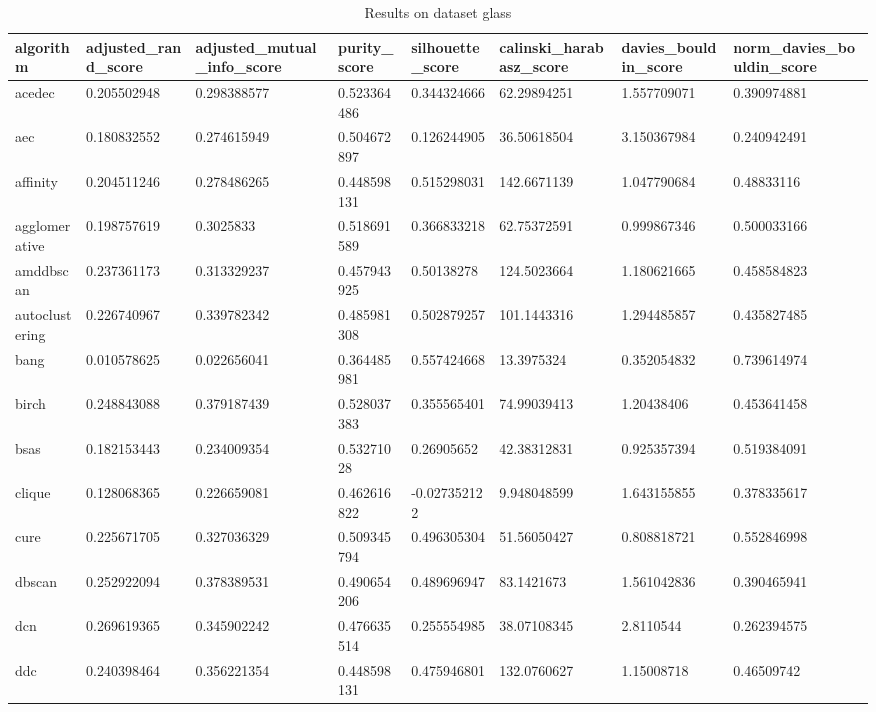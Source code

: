 \begin{table}[H]
\centering
\caption{Results on dataset glass}
\label{tab:params:glass}
\begin{tabular}{|l|l|l|l|l|l|l|l|}
\hline
algorithm & adjusted\_rand\_score & adjusted\_mutual\_info\_score & purity\_score & silhouette\_score & calinski\_harabasz\_score & davies\_bouldin\_score & norm\_davies\_bouldin\_score \\
\hline
acedec & 0.205502948 & 0.298388577 & 0.523364486 & 0.344324666 & 62.29894251 & 1.557709071 & 0.390974881 \\
\hline
aec & 0.180832552 & 0.274615949 & 0.504672897 & 0.126244905 & 36.50618504 & 3.150367984 & 0.240942491 \\
\hline
affinity & 0.204511246 & 0.278486265 & 0.448598131 & 0.515298031 & 142.6671139 & 1.047790684 & 0.48833116 \\
\hline
agglomerative & 0.198757619 & 0.3025833 & 0.518691589 & 0.366833218 & 62.75372591 & 0.999867346 & 0.500033166 \\
\hline
amddbscan & 0.237361173 & 0.313329237 & 0.457943925 & 0.50138278 & 124.5023664 & 1.180621665 & 0.458584823 \\
\hline
autoclustering & 0.226740967 & 0.339782342 & 0.485981308 & 0.502879257 & 101.1443316 & 1.294485857 & 0.435827485 \\
\hline
bang & 0.010578625 & 0.022656041 & 0.364485981 & 0.557424668 & 13.3975324 & 0.352054832 & 0.739614974 \\
\hline
birch & 0.248843088 & 0.379187439 & 0.528037383 & 0.355565401 & 74.99039413 & 1.20438406 & 0.453641458 \\
\hline
bsas & 0.182153443 & 0.234009354 & 0.53271028 & 0.26905652 & 42.38312831 & 0.925357394 & 0.519384091 \\
\hline
clique & 0.128068365 & 0.226659081 & 0.462616822 & -0.027352122 & 9.948048599 & 1.643155855 & 0.378335617 \\
\hline
cure & 0.225671705 & 0.327036329 & 0.509345794 & 0.496305304 & 51.56050427 & 0.808818721 & 0.552846998 \\
\hline
dbscan & 0.252922094 & 0.378389531 & 0.490654206 & 0.489696947 & 83.1421673 & 1.561042836 & 0.390465941 \\
\hline
dcn & 0.269619365 & 0.345902242 & 0.476635514 & 0.255554985 & 38.07108345 & 2.8110544 & 0.262394575 \\
\hline
ddc & 0.240398464 & 0.356221354 & 0.448598131 & 0.475946801 & 132.0760627 & 1.15008718 & 0.46509742 \\

\end{tabular}
\end{table}
